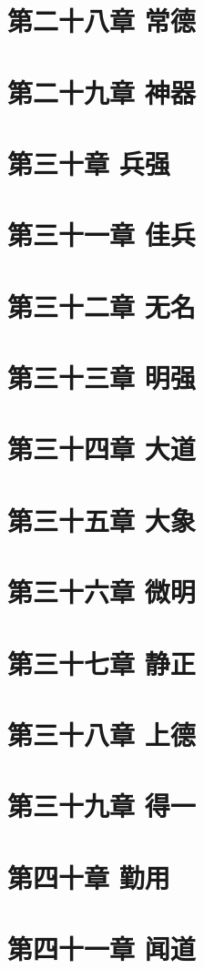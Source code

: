 \documentclass[UTF8]{ctexart}
\begin{document}
	\section{第二十八章 常德}
	\section{第二十九章 神器}
	\section{第三十章 兵强}
	\section{第三十一章 佳兵}
	\section{第三十二章 无名}
	\section{第三十三章 明强}
	\section{第三十四章 大道}
	\section{第三十五章 大象}
	\section{第三十六章 微明}
	\section{第三十七章 静正}
	\section{第三十八章 上德}
	\section{第三十九章 得一}
	\section{第四十章 勤用}
	\section{第四十一章 闻道}
\end{document}
